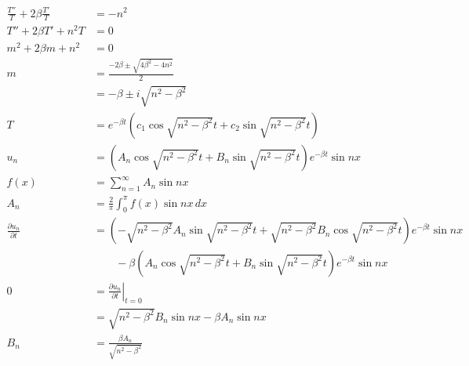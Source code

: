\documentclass{article}
\begin{document}
\begin{align*}
  \frac{T''}{T} + 2 \beta \frac{T'}{T} & = -n^2                                                                                                                                 \\
  T'' + 2 \beta T' + n^2 T             & = 0                                                                                                                                    \\
  m^2 + 2 \beta m + n^2                & = 0                                                                                                                                    \\
  m                                    & = \frac{-2 \beta \pm \sqrt{4 \beta^2 - 4 n^2}}{2}                                                                                      \\
                                       & = -\beta \pm i \sqrt{n^2 - \beta^2}                                                                                                    \\
  T                                    & = e^{-\beta t} (c_1 \cos \sqrt{n^2 - \beta^2} t + c_2 \sin \sqrt{n^2 - \beta^2} t)                                                     \\
  u_n                                  & = (A_n \cos \sqrt{n^2 - \beta^2} t + B_n \sin \sqrt{n^2 - \beta^2} t) e^{-\beta t} \sin n x                                            \\
  f(x)                                 & = \sum_{n = 1}^\infty A_n \sin n x                                                                                                     \\
  A_n                                  & = \frac{2}{\pi} \int_0^\pi f(x) \sin n x \,d x                                                                                         \\
  \frac{\partial u_n}{\partial t}      & = (-\sqrt{n^2 - \beta^2} A_n \sin \sqrt{n^2 - \beta^2} t + \sqrt{n^2 - \beta^2} B_n \cos \sqrt{n^2 - \beta^2} t) e^{-\beta t} \sin n x \\
                                       & \qquad - \beta (A_n \cos \sqrt{n^2 - \beta^2} t + B_n \sin \sqrt{n^2 - \beta^2} t) e^{-\beta t} \sin n x                               \\
  0                                    & = \left. \frac{\partial u_n}{\partial t} \right|_{t = 0}                                                                               \\
                                       & = \sqrt{n^2 - \beta^2} B_n \sin n x - \beta A_n \sin n x                                                                               \\
  B_n                                  & = \frac{\beta A_n}{\sqrt{n^2 - \beta^2}}
\end{align*}
\end{document}
